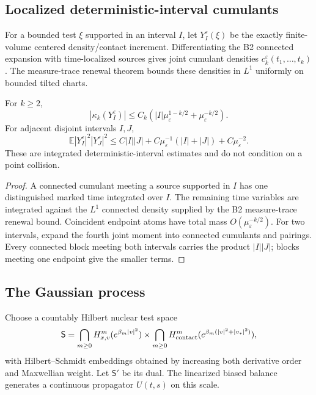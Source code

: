 \subsection{Localized deterministic-interval cumulants}

For a bounded test $\xi$ supported in an interval $I$, let
$Y_I^\varepsilon(\xi)$ be the exactly finite-volume centered density/contact
increment.  Differentiating the B2 connected expansion with time-localized
sources gives joint cumulant densities $c_k^\varepsilon(t_1,\ldots,t_k)$.
The measure-trace renewal theorem bounds these densities in $L^1$ uniformly on
bounded tilted charts.

\begin{lemma}
\label{lem:r7-b3-cumulants}
For $k\ge2$,
\[
 |\kappa_k(Y_I^\varepsilon)|
 \le C_k\left(|I|\mu_\varepsilon^{1-k/2}
             +\mu_\varepsilon^{-k/2}\right).
\]
For adjacent disjoint intervals $I,J$,
\[
 \mathbb E|Y_I^\varepsilon|^2|Y_J^\varepsilon|^2
 \le C|I||J|+C\mu_\varepsilon^{-1}(|I|+|J|)
 +C\mu_\varepsilon^{-2}.
\]
These are integrated deterministic-interval estimates and do not condition on
a point collision.
\end{lemma}

\begin{proof}
A connected cumulant meeting a source supported in $I$ has one distinguished
marked time integrated over $I$.  The remaining time variables are integrated
against the $L^1$ connected density supplied by the B2 measure-trace renewal
bound.  Coincident endpoint atoms have total mass
$O(\mu_\varepsilon^{-k/2})$.  For two intervals, expand the fourth joint moment
into connected cumulants and pairings.  Every connected block meeting both
intervals carries the product $|I||J|$; blocks meeting one endpoint give the
smaller terms.
\end{proof}

\subsection{The Gaussian process}

Choose a countably Hilbert nuclear test space
\[
 \mathsf S=\bigcap_{m\ge0}H^{m}_{x,v}(e^{\beta_m|v|^2})
 \times\bigcap_{m\ge0}H^{m}_{\rm contact}
 (e^{\beta_m(|v|^2+|v_*|^2)}),
\]
with Hilbert--Schmidt embeddings obtained by increasing both derivative order
and Maxwellian weight.  Let $\mathsf S'$ be its dual.  The linearized biased
balance generates a continuous propagator $U(t,s)$ on this scale.


